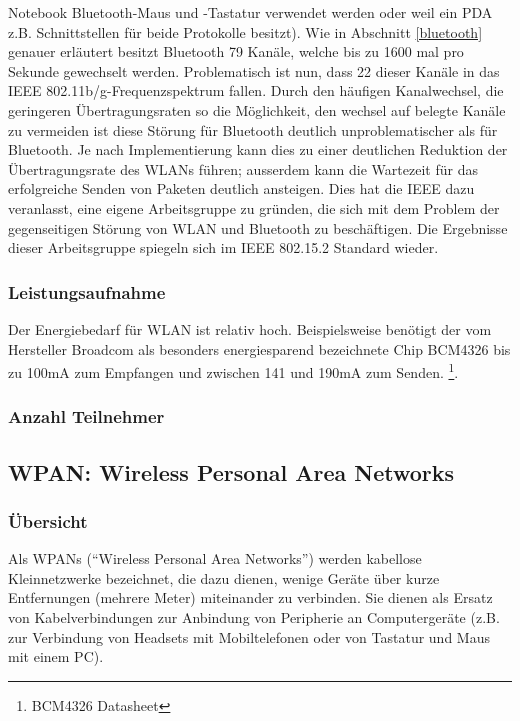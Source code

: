 Notebook Bluetooth-Maus und -Tastatur verwendet werden oder weil 
ein PDA z.B. Schnittstellen für beide Protokolle besitzt).
Wie in Abschnitt \ref{bluetooth} genauer erläutert besitzt Bluetooth
79 Kanäle, welche bis zu 1600 mal pro Sekunde gewechselt werden.
Problematisch ist nun, dass 22 dieser Kanäle in das 
IEEE 802.11b/g-Frequenzspektrum fallen. Durch den häufigen
Kanalwechsel, die geringeren Übertragungsraten so die 
Möglichkeit, den wechsel auf belegte Kanäle zu vermeiden ist diese
Störung für Bluetooth deutlich unproblematischer als für Bluetooth.
Je nach Implementierung kann dies zu einer deutlichen Reduktion
der Übertragungsrate des WLANs führen; ausserdem kann die Wartezeit
für das erfolgreiche Senden von Paketen deutlich ansteigen.
Dies hat die IEEE dazu veranlasst, eine eigene Arbeitsgruppe
zu gründen, die sich mit dem Problem der gegenseitigen Störung
von WLAN und Bluetooth zu beschäftigen. Die Ergebnisse dieser
Arbeitsgruppe spiegeln sich im IEEE 802.15.2 Standard wieder.

\subsubsection{Leistungsaufnahme}
Der Energiebedarf für WLAN ist relativ hoch. Beispielsweise benötigt der
vom Hersteller Broadcom als besonders energiesparend bezeichnete Chip
BCM4326 bis zu 100mA zum Empfangen und zwischen 141 und 190mA zum Senden.
\footnote{BCM4326 Datasheet}. 

\subsubsection{Anzahl Teilnehmer}

\subsection{WPAN: Wireless Personal Area Networks}
    \subsubsection{Übersicht}
        Als WPANs ("`Wireless Personal Area Networks"') werden kabellose Kleinnetzwerke bezeichnet, die dazu dienen,
        wenige Geräte über kurze Entfernungen (mehrere Meter) miteinander zu verbinden. Sie dienen als Ersatz 
        von Kabelverbindungen zur Anbindung von Peripherie an Computergeräte (z.B. zur Verbindung von
        Headsets mit Mobiltelefonen oder von Tastatur und Maus mit einem PC).
        

